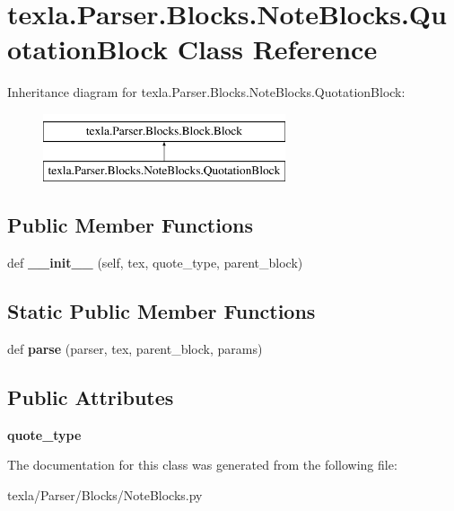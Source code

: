 \hypertarget{classtexla_1_1Parser_1_1Blocks_1_1NoteBlocks_1_1QuotationBlock}{}\section{texla.\+Parser.\+Blocks.\+Note\+Blocks.\+Quotation\+Block Class Reference}
\label{classtexla_1_1Parser_1_1Blocks_1_1NoteBlocks_1_1QuotationBlock}
Inheritance diagram for texla.\+Parser.\+Blocks.\+Note\+Blocks.\+Quotation\+Block\+:\begin{figure}[H]
\begin{center}
\leavevmode
\includegraphics[height=2.000000cm]{classtexla_1_1Parser_1_1Blocks_1_1NoteBlocks_1_1QuotationBlock}
\end{center}
\end{figure}
\subsection*{Public Member Functions}
\begin{DoxyCompactItemize}
\item 
\hypertarget{classtexla_1_1Parser_1_1Blocks_1_1NoteBlocks_1_1QuotationBlock_ad369a479e46a782bdc2b096fe15f3d1d}{}\label{classtexla_1_1Parser_1_1Blocks_1_1NoteBlocks_1_1QuotationBlock_ad369a479e46a782bdc2b096fe15f3d1d} 
def {\bfseries \+\_\+\+\_\+init\+\_\+\+\_\+} (self, tex, quote\+\_\+type, parent\+\_\+block)
\end{DoxyCompactItemize}
\subsection*{Static Public Member Functions}
\begin{DoxyCompactItemize}
\item 
\hypertarget{classtexla_1_1Parser_1_1Blocks_1_1NoteBlocks_1_1QuotationBlock_a755d927388a76e7f5eaf1792c5f733c0}{}\label{classtexla_1_1Parser_1_1Blocks_1_1NoteBlocks_1_1QuotationBlock_a755d927388a76e7f5eaf1792c5f733c0} 
def {\bfseries parse} (parser, tex, parent\+\_\+block, params)
\end{DoxyCompactItemize}
\subsection*{Public Attributes}
\begin{DoxyCompactItemize}
\item 
\hypertarget{classtexla_1_1Parser_1_1Blocks_1_1NoteBlocks_1_1QuotationBlock_a98c2904651896fef591b5feda9cf2646}{}\label{classtexla_1_1Parser_1_1Blocks_1_1NoteBlocks_1_1QuotationBlock_a98c2904651896fef591b5feda9cf2646} 
{\bfseries quote\+\_\+type}
\end{DoxyCompactItemize}


The documentation for this class was generated from the following file\+:\begin{DoxyCompactItemize}
\item 
texla/\+Parser/\+Blocks/Note\+Blocks.\+py\end{DoxyCompactItemize}
